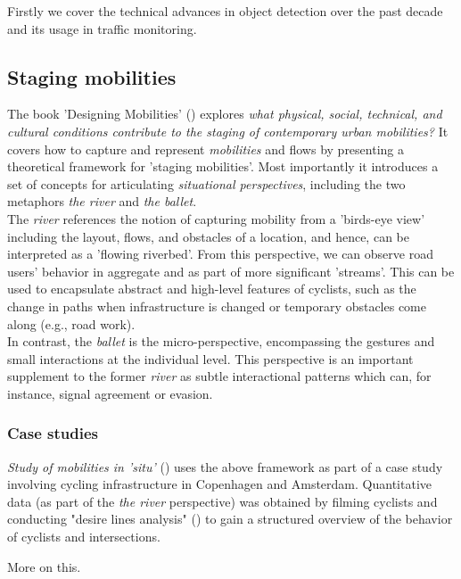 \color{red}
Firstly we cover the technical advances in object detection over the past decade and its usage in traffic monitoring.
\color{black}

\subsection{Staging mobilities}
The book 'Designing Mobilities' (\cite{designinig_mobilities}) explores \textit{what physical, social, technical, and cultural conditions contribute to the staging of contemporary urban
mobilities?} It covers how to capture and represent \textit{mobilities} and flows by presenting a theoretical framework for 'staging mobilities'. 
Most importantly it introduces a set of concepts for articulating \textit{situational perspectives},
 including the two metaphors \textit{the river} and \textit{the ballet}. 
 \ \\

 The \textit{river} references the notion of capturing mobility from a 'birds-eye view' including the layout, flows, and obstacles of a location, and hence, can be interpreted as a 'flowing riverbed'. From this perspective, we can observe road users' behavior in aggregate and as part of more significant 'streams'. This can be used to encapsulate abstract and high-level features of cyclists, such as the change in paths
 when infrastructure is changed or temporary obstacles come along (e.g., road work).
 \ \\

In contrast, the \textit{ballet} is the micro-perspective, encompassing the gestures and small interactions at the individual level.
This perspective is an important supplement to the former \textit{river} as subtle interactional patterns which can, for instance,
 signal agreement or evasion.

\subsubsection{Case studies}
\textit{Study of mobilities in 'situ'} (\cite{situ}) uses the above framework as part of a case study involving cycling infrastructure in 
Copenhagen and Amsterdam. Quantitative data (as part of the \textit{the river} perspective) was obtained by filming cyclists and conducting 
"desire lines analysis" (\cite{cva}) to gain a structured overview of the behavior of cyclists and intersections. 

\color{red}
More on this.
\color{black}

